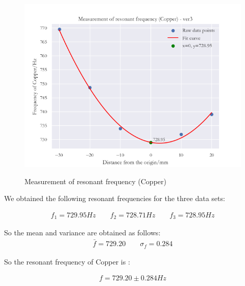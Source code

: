 \documentclass[UTF8]{article}
\begin{document}
\begin{figure}[H]
\begin{minipage}[t]{0.33\linewidth}
         \includegraphics[clip,scale=0.35,trim={0 0 0 0}]{fig/fig10.png}
         \label{figure.12}
      \end{minipage} 
     \caption{Measurement of resonant frequency (Copper)}	  
      \end{figure}   
   	          
   	 We obtained the following resonant frequencies for the three data sets:
   	 
   	 \begin{eqnarray}
   	 f_1 = 729.95 Hz \qquad f_2 = 728.71 Hz \qquad f_3 = 728.95 Hz
   	 \end{eqnarray}
   	 
   	 So the mean and variance are obtained as follows:
   	 \begin{eqnarray}
   	 \bar{f} = 729.20 \qquad \sigma_f = 0.284
   	 \end{eqnarray}
   	 
   	 So the resonant frequency of Copper is :
   	 
   	 \begin{eqnarray}
   	 f = 729.20 \pm 0.284 Hz
   	 \end{eqnarray}
   	 
\end{document}
